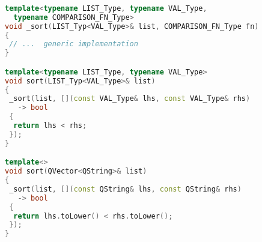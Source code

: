 \begin{lstlisting}[caption={Templates and Explicit Specialization}, 
  language = C++, numbers = none, escapechar = !,label={lst:sorts},
    basicstyle = \ttfamily\bfseries\footnotesize, linewidth = \linewidth]
	
template<typename LIST_Type, typename VAL_Type, 
  typename COMPARISON_FN_Type>
void _sort(LIST_Typ<VAL_Type>& list, COMPARISON_FN_Type fn)
{
 // ...  generic implementation
}

template<typename LIST_Type, typename VAL_Type>
void sort(LIST_Typ<VAL_Type>& list)
{
 _sort(list, [](const VAL_Type& lhs, const VAL_Type& rhs)
   -> bool
 {
  return lhs < rhs;
 });
}

template<>
void sort(QVector<QString>& list)
{
 _sort(list, [](const QString& lhs, const QString& rhs)
   -> bool
 {
  return lhs.toLower() < rhs.toLower();
 });
}
 
\end{lstlisting}

